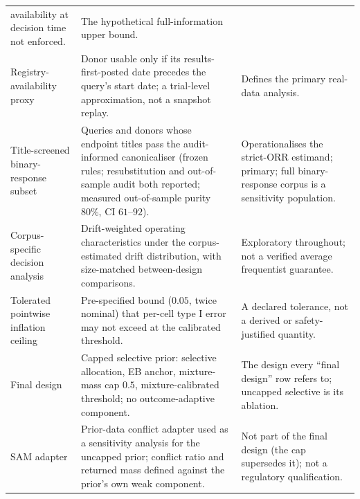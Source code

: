 \documentclass[11pt]{article}
\begin{document}
\begin{longtable}{p{} p{} p{}}
availability at decision time not enforced. & The hypothetical
full-information upper bound. \\
Registry-availability proxy & Donor usable only if its results-first-posted
date precedes the query's start date; a trial-level approximation, not a
snapshot replay. & Defines the primary real-data analysis. \\
Title-screened binary-response subset & Queries and donors whose endpoint titles pass
the audit-informed canonicaliser (frozen rules; resubstitution and
out-of-sample audit both reported; measured out-of-sample purity $80\%$,
CI $61$--$92$). & Operationalises the strict-ORR
estimand; primary; full binary-response corpus is a sensitivity
population. \\
Corpus-specific decision analysis & Drift-weighted operating
characteristics under the corpus-estimated drift distribution, with
size-matched between-design comparisons. & Exploratory throughout; not a
verified average frequentist guarantee. \\
Tolerated pointwise inflation ceiling & Pre-specified bound ($0.05$, twice
nominal) that per-cell type I error may not exceed at the calibrated
threshold. & A declared tolerance, not a derived or safety-justified
quantity. \\
Final design & Capped selective prior: selective allocation, EB anchor,
mixture-mass cap $0.5$, mixture-calibrated threshold; no outcome-adaptive
component. & The design every ``final design'' row refers to; uncapped
selective is its ablation. \\
SAM adapter & Prior-data conflict adapter used as a sensitivity analysis for
the uncapped prior; conflict ratio and returned mass defined against the
prior's own weak component. & Not part of the final design (the cap
supersedes it); not a regulatory qualification. \\
\bottomrule
\end{longtable}

\end{document}
